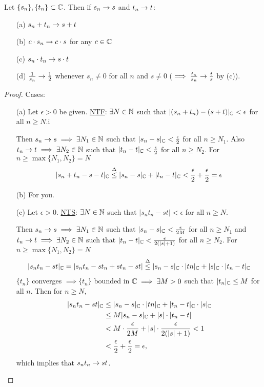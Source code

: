 \documentclass[]{article}
\begin{document}
\begin{theorem}
	Let $\{s_n\},\{t_n\}\subset\mathbb{C}$. Then if $s_n\rightarrow s$ and $t_n\rightarrow t$:
	\begin{enumerate}
		\item[(a)] $s_n + t_n\rightarrow s+t$
		\item[(b)] $c\cdot s_n \rightarrow c\cdot s$ for any $c\in\mathbb{C}$
		\item[(c)] $s_n\cdot t_n\rightarrow s\cdot t$
		\item[(d)] $\frac{1}{s_n} \rightarrow \frac{1}{2}$ whenever $s_n\neq 0$ for all $n$ and $s\neq 0$ ($\implies \frac{t_n}{s_n} \rightarrow \frac{t}{s}$ by (c)).
	\end{enumerate}
\end{theorem}
\begin{proof}
	Cases:
	\begin{enumerate}
		\item[(a)] Let \ul{$\epsilon > 0$} be given. \ul{NTF}: $\exists N\in\mathbb{N}$ such that $|(s_n+t_n) - (s+t)|_{\mathbb{C}} < \epsilon$ for all $n\geq N$.i

			Then $s_n\rightarrow s \implies \exists N_1\in\mathbb{N}$ such that $|s_n-s|_{\mathbb{C}} < \frac{\epsilon}{2}$ for all $n\geq N_1$.
			Also $t_n\rightarrow t \implies \exists N_2\in\mathbb{N}$ such that $|t_n-t|_{\mathbb{C}} < \frac{\epsilon}{2}$ for all $n\geq N_2$.
			For $n\geq \max\{N_1,N_2\} = N$
			\begin{align*}
				| s_n + t_n - s - t|_{\mathbb{C}} \overset{\Delta}{\leq} |s_n-s|_{\mathbb{C}} + |t_n-t|_{\mathbb{C}} < \frac{\epsilon}{2} + \frac{\epsilon}{2} = \epsilon
			\end{align*}

		\item[(b)] For you.

		\item[(c)] Let $\epsilon > 0$. \ul{NTS}: $\exists N\in\mathbb{N}$ such that $|s_n t_n - st|<\epsilon$ for all $n\geq N$.

			Then $s_n\rightarrow s\implies \exists N_1\in\mathbb{N}$ such that $|s_n-s|_{\mathbb{C}}< \frac{\epsilon}{2M}$ for all $n\geq N_1$
			and $t_n\rightarrow t \implies \exists N_2\in\mathbb{N}$ such that $|t_n-t|_{\mathbb{C}}< \frac{\epsilon}{2(|s|+1)}$ for all $n\geq N_2$.
			For $n\geq \max\{N_1,N_2\} = N$
			\begin{align*}
				|s_nt_n-st|_{\mathbb{C}} = |s_nt_n-st_n + st_n - st| \overset{\Delta}{\leq} |s_n - s|_{\mathbb{C}}\cdot |tn|_{\mathbb{C}} + |s|_{\mathbb{C}} \cdot |t_n-t|_{\mathbb{C}}
			\end{align*}
			$\{t_n\}$ converges $\implies \{t_n\}$ bounded in $\mathbb{C} \implies \exists M>0$ such that $|t_n|_{\mathbb{C}} \leq M$ for all $n$.
			Then for $n\geq N$,
			\begin{align*}
				|s_nt_n-st|_{\mathbb{C}} &\leq |s_n-s|_{\mathbb{C}} \cdot |tn|_{\mathbb{C}} + |t_n-t|_{\mathbb{C}} \cdot |s|_{\mathbb{C}} \\
								  &\leq M|s_n-s|_{\mathbb{C}} + |s|\cdot|t_n-t| \\
				&< M\cdot\frac{\epsilon}{2M} + |s|\cdot\frac{\epsilon}{2(|s|+1)} < 1 \\
				&< \frac{\epsilon}{2} + \frac{\epsilon}{2} = \epsilon,
			\end{align*}
			which implies that $s_nt_n\rightarrow st$.


\end{enumerate}
\end{proof}
\end{document}
